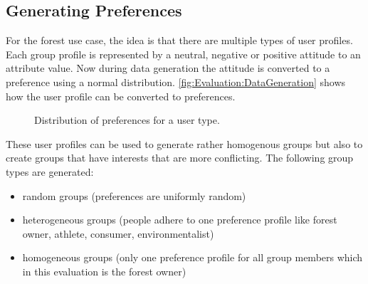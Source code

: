 
\subsection{Generating Preferences}

For the forest use case, the idea is that there are multiple types of user profiles. Each group profile is represented by a neutral, negative or positive attitude to an attribute value. Now during data generation the attitude is converted to a preference using a normal distribution. \autoref{fig:Evaluation:DataGeneration} shows how the user profile can be converted to preferences.

\pgfplotsset{height=5cm,width=\textwidth,compat=1.8}
\begin{figure}
 \caption{Distribution of preferences for a user type.}
\label{fig:Evaluation:DataGeneration}
\end{figure}

These user profiles can be used to generate rather homogenous groups but also to create groups that have interests that are more conflicting. The following group types are generated:

\begin{itemize}
    \item random groups (preferences are uniformly random)
    \item heterogeneous groups (people adhere to one preference profile like forest owner, athlete, consumer, environmentalist)
    \item homogeneous groups (only one preference profile for all group members which in this evaluation is the forest owner)
\end{itemize}

